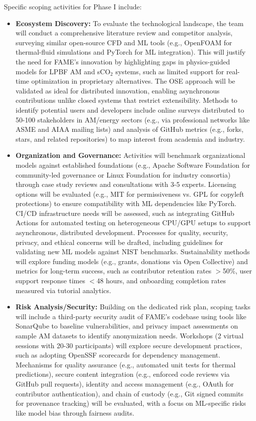 \documentclass[11pt]{article}
\begin{document}
Specific scoping activities for Phase I include:
\vspace{-3pt}
\begin{itemize}
    \item \textbf{Ecosystem Discovery:} To evaluate the technological landscape, the team will conduct a comprehensive literature review and competitor analysis, surveying similar open-source CFD and ML tools (e.g., OpenFOAM for thermal-fluid simulations and PyTorch for ML integration). This will justify the need for FAME's innovation by highlighting gaps in physics-guided models for LPBF AM and sCO$_2$ systems, such as limited support for real-time optimization in proprietary alternatives. The OSE approach will be validated as ideal for distributed innovation, enabling asynchronous contributions unlike closed systems that restrict extensibility. Methods to identify potential users and developers include online surveys distributed to 50-100 stakeholders in AM/energy sectors (e.g., via professional networks like ASME and AIAA mailing lists) and analysis of GitHub metrics (e.g., forks, stars, and related repositories) to map interest from academia and industry.
    \item \textbf{Organization and Governance:} Activities will benchmark organizational models against established foundations (e.g., Apache Software Foundation for community-led governance or Linux Foundation for industry consortia) through case study reviews and consultations with 3-5 experts. Licensing options will be evaluated (e.g., MIT for permissiveness vs. GPL for copyleft protections) to ensure compatibility with ML dependencies like PyTorch. CI/CD infrastructure needs will be assessed, such as integrating GitHub Actions for automated testing on heterogeneous CPU/GPU setups to support asynchronous, distributed development. Processes for quality, security, privacy, and ethical concerns will be drafted, including guidelines for validating new ML models against NIST benchmarks. Sustainability methods will explore funding models (e.g., grants, donations via Open Collective) and metrics for long-term success, such as contributor retention rates $>$50\%, user support response times $<$48 hours, and onboarding completion rates measured via tutorial analytics.
    \item \textbf{Risk Analysis/Security:} Building on the dedicated risk plan, scoping tasks will include a third-party security audit of FAME's codebase using tools like SonarQube to baseline vulnerabilities, and privacy impact assessments on sample AM datasets to identify anonymization needs. Workshops (2 virtual sessions with 20-30 participants) will explore secure development practices, such as adopting OpenSSF scorecards for dependency management. Mechanisms for quality assurance (e.g., automated unit tests for thermal predictions), secure content integration (e.g., enforced code reviews via GitHub pull requests), identity and access management (e.g., OAuth for contributor authentication), and chain of custody (e.g., Git signed commits for provenance tracking) will be evaluated, with a focus on ML-specific risks like model bias through fairness audits.

\end{itemize}
\end{document}
